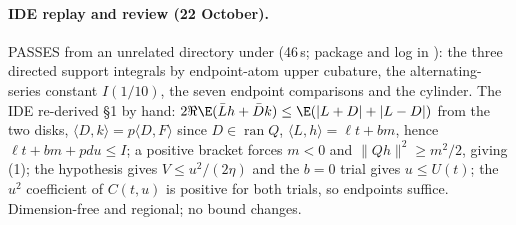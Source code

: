 \paragraph{IDE replay and review (22 October).}  PASSES from an unrelated directory under  (46\,s; package and log in
): the three directed support integrals by endpoint-atom upper cubature, the alternating-series constant $I(1/10)$, the seven endpoint
comparisons and the cylinder. The IDE re-derived \S1 by hand: $2\Re\E(\bar Lh+\bar Dk)\le\E(|L+D|+|L-D|)$ from the two disks, $\langle D,k\rangle=p\langle D,F\rangle$ since $D\in\operatorname{ran}Q$,
$\langle L,h\rangle=\ell t+bm$, hence $\ell t+bm+pdu\le I$; a positive bracket forces $m<0$ and $\|Qh\|^2\ge m^2/2$, giving (1); the hypothesis gives $V\le u^2/(2\eta)$ and the
$b=0$ trial gives $u\le U(t)$; the $u^2$ coefficient of $C(t,u)$ is positive for both trials, so endpoints suffice. Dimension-free and regional; no bound changes.
